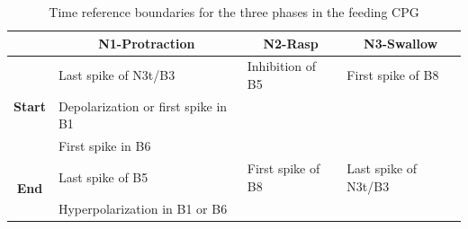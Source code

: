 \begin{table}[htb!]
	\centering
	\begin{tabular}{cl|l|l}
		\multicolumn{1}{l}{}                                 & \multicolumn{1}{c|}{\textbf{N1-Protraction}} & \multicolumn{1}{c|}{\textbf{N2-Rasp}} & \multicolumn{1}{c}{\textbf{N3-Swallow}} \\ \hline
		\multicolumn{1}{c|}{\multirow{3}{*}{\textbf{Start}}} & Last spike of N3t/B3                         & Inhibition of B5                      & First spike of B8                       \\
		\multicolumn{1}{c|}{}                                & Depolarization or first spike in B1          &                                       &                                         \\
		\multicolumn{1}{c|}{}                                & First spike in B6                            &                                       &                                         \\ \hline
		\multicolumn{1}{c|}{\multirow{2}{*}{\textbf{End}}}   & Last spike of B5                             & First spike of B8                     & Last spike of N3t/B3                    \\
		\multicolumn{1}{c|}{}                                & Hyperpolarization in B1 or B6                &                                       &                                        
	\end{tabular}
	\caption{Time reference boundaries for the three phases in the feeding CPG}
	\label{table:cpg ref intervals}
\end{table}



